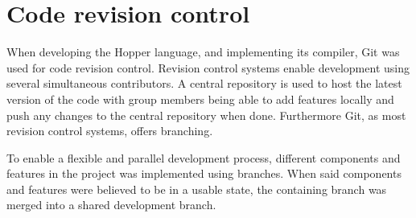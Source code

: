 \section{Code revision control}

When developing the Hopper language, and implementing its compiler, Git\cite{git} was used for code revision control.
Revision control systems enable development using several simultaneous contributors.
A central repository is used to host the latest version of the code with group members
being able to add features locally and push any changes to the central repository when done.  
Furthermore Git, as most revision control systems, offers branching.

To enable a flexible and parallel development process, different components and features in the project was implemented using branches. When said components and features were believed to be in a usable state, the containing branch was merged into a shared development branch.